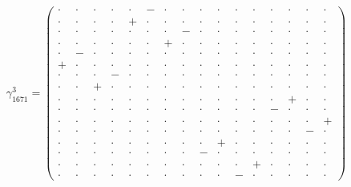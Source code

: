\documentclass[
  10pt,
]{article}
\begin{document}
\[\gamma_{1671}^3=\left(\begin{smallmatrix} \cdot & \cdot & \cdot & \cdot & \cdot & - & \cdot & \cdot & \cdot & \cdot & \cdot & \cdot & \cdot & \cdot & \cdot & \cdot \\ \cdot & \cdot & \cdot & \cdot & + & \cdot & \cdot & \cdot & \cdot & \cdot & \cdot & \cdot & \cdot & \cdot & \cdot & \cdot \\ \cdot & \cdot & \cdot & \cdot & \cdot & \cdot & \cdot & - & \cdot & \cdot & \cdot & \cdot & \cdot & \cdot & \cdot & \cdot \\ \cdot & \cdot & \cdot & \cdot & \cdot & \cdot & + & \cdot & \cdot & \cdot & \cdot & \cdot & \cdot & \cdot & \cdot & \cdot \\ \cdot & - & \cdot & \cdot & \cdot & \cdot & \cdot & \cdot & \cdot & \cdot & \cdot & \cdot & \cdot & \cdot & \cdot & \cdot \\ + & \cdot & \cdot & \cdot & \cdot & \cdot & \cdot & \cdot & \cdot & \cdot & \cdot & \cdot & \cdot & \cdot & \cdot & \cdot \\ \cdot & \cdot & \cdot & - & \cdot & \cdot & \cdot & \cdot & \cdot & \cdot & \cdot & \cdot & \cdot & \cdot & \cdot & \cdot \\ \cdot & \cdot & + & \cdot & \cdot & \cdot & \cdot & \cdot & \cdot & \cdot & \cdot & \cdot & \cdot & \cdot & \cdot & \cdot \\ \cdot & \cdot & \cdot & \cdot & \cdot & \cdot & \cdot & \cdot & \cdot & \cdot & \cdot & \cdot & \cdot & + & \cdot & \cdot \\ \cdot & \cdot & \cdot & \cdot & \cdot & \cdot & \cdot & \cdot & \cdot & \cdot & \cdot & \cdot & - & \cdot & \cdot & \cdot \\ \cdot & \cdot & \cdot & \cdot & \cdot & \cdot & \cdot & \cdot & \cdot & \cdot & \cdot & \cdot & \cdot & \cdot & \cdot & + \\ \cdot & \cdot & \cdot & \cdot & \cdot & \cdot & \cdot & \cdot & \cdot & \cdot & \cdot & \cdot & \cdot & \cdot & - & \cdot \\ \cdot & \cdot & \cdot & \cdot & \cdot & \cdot & \cdot & \cdot & \cdot & + & \cdot & \cdot & \cdot & \cdot & \cdot & \cdot \\ \cdot & \cdot & \cdot & \cdot & \cdot & \cdot & \cdot & \cdot & - & \cdot & \cdot & \cdot & \cdot & \cdot & \cdot & \cdot \\ \cdot & \cdot & \cdot & \cdot & \cdot & \cdot & \cdot & \cdot & \cdot & \cdot & \cdot & + & \cdot & \cdot & \cdot & \cdot \\ \cdot & \cdot & \cdot & \cdot & \cdot & \cdot & \cdot & \cdot & \cdot & \cdot & - & \cdot & \cdot & \cdot & \cdot & \cdot \end{smallmatrix}\right)\]
\end{document}
